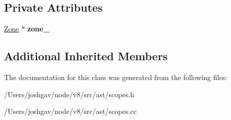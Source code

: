\subsection*{Private Attributes}
\begin{DoxyCompactItemize}
\item 
\hyperlink{classv8_1_1internal_1_1_zone}{Zone} $\ast$ {\bfseries zone\+\_\+}\hypertarget{classv8_1_1internal_1_1_variable_map_abc5780c52df8c37533ec5f78075854f5}{}\label{classv8_1_1internal_1_1_variable_map_abc5780c52df8c37533ec5f78075854f5}

\end{DoxyCompactItemize}
\subsection*{Additional Inherited Members}


The documentation for this class was generated from the following files\+:\begin{DoxyCompactItemize}
\item 
/\+Users/joshgav/node/v8/src/ast/scopes.\+h\item 
/\+Users/joshgav/node/v8/src/ast/scopes.\+cc\end{DoxyCompactItemize}
